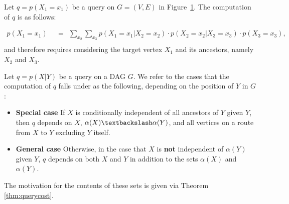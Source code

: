 \begin{example}\label{qe1}


 Let $q = p(X_{1} = x_{1})$ be a query on $G = (V,E)$ in Figure~\ref{fig:qe1}. The computation of $q$ is as follows:
 \begin{figure}[h!]
\centering
{}
\caption{}
\label{fig:qe1}
\end{figure}
 \begin{align*}
	p(X_{1} = x_{1}) & 	\ \ = \ \ \sum_{x_{2}} \sum_{x_{3}} p(X_{1}=x_{1}|X_{2}=x_{2}) \cdot p(X_{2}=x_{2}|X_{3}=x_{3}) \cdot p(X_{3}=x_{3}), \\
\end{align*}
and therefore requires considering the target vertex $X_{1}$ and its ancestors, namely $X_{2}$ and $X_{3}$.
\end{example}


\begin{definition} \label{thm:querycostonetarget}
Let $q = p(X|Y)$ be a query on a DAG $G$. We refer to the cases that the computation of $q$ falls under as the following, depending on the position of $Y$ in $G$: 
\begin{itemize}
\item \textbf{Special case} If $X$ is conditionally independent of all ancestors of $Y$ given $Y$, then $q$ depends on $X$, $\alpha(X)\textbackslash \alpha(Y)$, and all vertices on a route from $X$ to $Y$ excluding $Y$ itself. 
\item \textbf{General case} Otherwise, in the case that $X$ is \textbf{not} independent of $\alpha(Y)$ given $Y$, $q$ depends on both $X$ and $Y$ in addition to the sets $\alpha(X)$ and $\alpha(Y)$. 
\end{itemize}
\end{definition}

\begin{remark}
The motivation for the contents of these sets is given via Theorem \ref{thm:querycost}.
\end{remark} 


